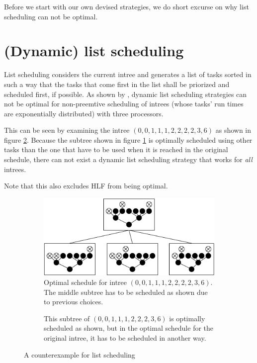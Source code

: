 Before we start with our own devised strategies, we do short excurse on why list scheduling can not be optimal.

\section{(Dynamic) list scheduling}
\label{sec:suboptimal-strategies-list-scheduling}

List scheduling considers the current intree and generates a list of tasks sorted in such a way that the tasks that come first in the list shall be priorized and scheduled first, if possible. As shown by \cite{MoritzMaasDiploma}, dynamic list scheduling strategies can not be optimal for non-preemtive scheduling of intrees (whose tasks' run times are exponentially distributed) with three processors.

This can be seen by examining the intree $(0,0,1,1,1,2,2,2,2,3,6)$ as shown in figure \ref{fig:list-scheduling-counter-example}. Because the subtree shown in figure \ref{fig:list-schedule-counter-example-subtree} is optimally scheduled using other tasks than the one that have to be used when it is reached in the original schedule, there can not exist a dynamic list scheduling strategy that works for \emph{all} intrees.

Note that this also excludes HLF from being optimal.

\begin{figure}[ht]
  \centering
  \begin{subfigure}[b]{.5\textwidth}
    \centering
    \includegraphics{p3/list_sched_0011122236_opt_sched.pdf}
    \caption{Optimal schedule for intree $(0,0,1,1,1,2,2,2,2,3,6)$. The middle subtree has to be scheduled as shown due to previous choices.}
  \end{subfigure}
  \quad
  \begin{subfigure}[b]{.4\textwidth}
    \centering
    \vfill
    
    \vfill
    \caption{This subtree of $(0,0,1,1,1,2,2,2,3,6)$ is optimally scheduled as shown, but in the optimal schedule for the original intree, it has to be scheduled in another way.}
    \label{fig:list-schedule-counter-example-subtree}
  \end{subfigure}
  \caption{A counterexample for list scheduling}
  \label{fig:list-scheduling-counter-example}
\end{figure}

